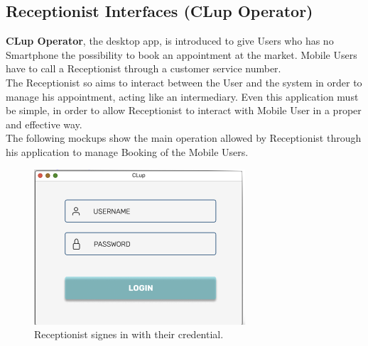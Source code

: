 \subsection{Receptionist Interfaces (CLup Operator)}
\textbf{CLup Operator}, the desktop app, is introduced to give Users who has no Smartphone the possibility to book an appointment at the market. Mobile Users have to call a Receptionist through a customer service number.\\
The Receptionist so aims to interact between the User and the system in order to manage his appointment, acting like an intermediary.
Even this application must be simple, in order to allow Receptionist to interact with Mobile User in a proper and effective way.\\
The following mockups show the main operation allowed by Receptionist through his application to manage Booking of the Mobile Users.
\begin{figure}[H]
  \caption{Receptionist signes in with their credential.}
  \label{fig:Login}
  \centering
  \includegraphics[scale=0.55]{images/mockup/LOGIN_REC.png}

\end{figure}

